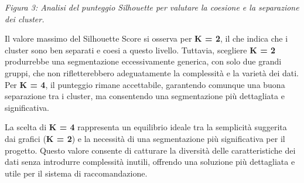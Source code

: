 \documentclass[a4paper,12pt]{article}
\begin{document}
\begin{itemize}
\begin{center}
\textit{Figura 3: Analisi del punteggio Silhouette per valutare la coesione e la separazione dei cluster.}
	\end{center}


Il valore massimo del Silhouette Score si osserva per \textbf{K = 2}, il che indica che i cluster sono ben separati e coesi a questo livello. Tuttavia, scegliere \textbf{K = 2} produrrebbe una segmentazione eccessivamente generica, con solo due grandi gruppi, che non rifletterebbero adeguatamente la complessità e la varietà dei dati. Per \textbf{K = 4}, il punteggio rimane accettabile, garantendo comunque una buona separazione tra i cluster, ma consentendo una segmentazione più dettagliata e significativa.
		\end{itemize}


La scelta di \textbf{K = 4} rappresenta un equilibrio ideale tra la semplicità suggerita dai grafici (\textbf{K = 2}) e la necessità di una segmentazione più significativa per il progetto. Questo valore consente di catturare la diversità delle caratteristiche dei dati senza introdurre complessità inutili, offrendo una soluzione più dettagliata e utile per il sistema di raccomandazione.
\newpage
\end{document}
